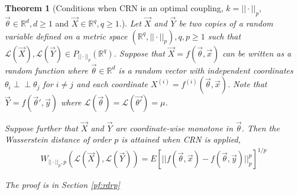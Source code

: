 \documentclass[12pt]{article}
\theoremstyle{plain}%
\newtheorem{theorem}{Theorem}[section]
\theoremstyle{definition}
\newcommand{\indep}{\perp \!\!\! \perp}
\begin{document}
\begin{theorem}[Conditions when CRN is an optimal coupling, $k=||\cdot||_p$,  $\vec{\theta} \in \mathbb{R}^d, d\geq 1$ and $\vec{X}\in\mathbb{R}^q, q\geq 1$.]\label{thm:rdrp}
	Let $\vec{X}$ and $\vec{Y}$ be two copies of a random variable defined on a metric space $(\mathbb{R}^q,||\cdot||_p), q,p\geq 1$ such that $\mathcal{L}(\vec{X}), \mathcal{L}(\vec{Y})\in P_{||\cdot||_p}(\mathbb{R}^q)$. Suppose that $\vec{X}=f(\vec{\theta},\vec{x})$ can be written as a random function where $\vec{\theta}\in \mathbb{R}^d$ is a random vector with independent coordinates $\theta_i\indep\theta_j$ for $i\neq j$ and each coordinate $X^{(i)}=f^{(i)}(\vec{\theta},\vec{x})$. Note that $\vec{Y}=f(\vec{\theta}',\vec{y})$ where  $\mathcal{L}(\vec{\theta})=\mathcal{L}(\vec{\theta'})=\mu$.
	
	Suppose further that $\vec{X}$ and $\vec{Y}$ are coordinate-wise monotone in $\vec{\theta}$. %
	Then the Wasserstein distance of order $p$ is attained when CRN is applied,
	\begin{align}\label{eq:rdrpconc}
		W_{||\cdot||_p,p}(\mathcal{L}(\vec{X}), \mathcal{L}(\vec{Y}))=
		E[||f(\vec{\theta},\vec{x})-f(\vec{\theta},\vec{y})||_p^p]^{1/p}
	\end{align}
	
	The proof is in Section \ref{pf:rdrp}
\end{theorem}
\end{document}
